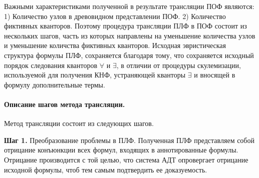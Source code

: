 \documentclass[a4paper]{jctart15b}
\begin{document}







Важными характеристиками полученной в результате трансляции ПОФ являются: 1) Количество узлов в древовидном представлении ПОФ. 2) Количество фиктивных кванторов. Поэтому процедура трансляции ПЛФ в ПОФ состоит из нескольких шагов, часть из которых направлены на уменьшение количества узлов и уменьшение количства фиктивных кванторов. Исходная эвристическая структура формулы ПЛФ, сохраняется благодаря тому, что сохраняется исходный порядок следования кванторов $\forall$ и $\exists$, в отличии от процедуры скулемизации, используемой для получения КНФ, устраняющей кванторы $\exists$ и вносящей в формулу дополнительные термы.

\paragraph{Описание шагов метода трансляции.}

Метод трансляции состоит из следующих шагов.

\textbf{Шаг 1.} Преобразование проблемы в ПЛФ. Полученная ПЛФ представляем собой отрицание конъюнкции всех формул, входящих в аннотированные формулы. Отрицание производится с той целью, что система АДТ опровергает отрицание исходной формулы, чтоб тем самым подтвердить ее доказуемость. %
\end{document}
